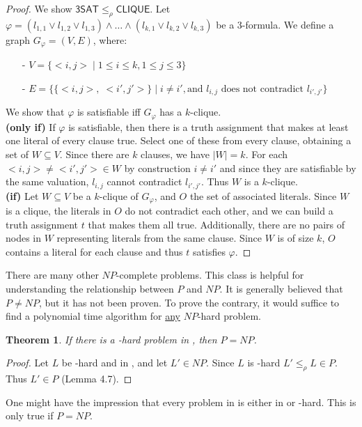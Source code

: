 \documentclass{report}
\newcommand{\NP}{\text{$\mathit{NP}$}\xspace}
\newcommand{\Po}{\text{$\mathit{P}$}\xspace}
\newtheorem{theorem}[definition]{Theorem}
\begin{document}
\begin{proof} We show $\mathsf{3SAT} \leq_\rho \mathsf{CLIQUE}$. Let $\varphi = (l_{1,1} \lor l_{1,2} \lor l_{1,3}) \land \dots \land (l_{k,1} \lor l_{k,2} \lor l_{k,3})$ be a 3-formula. We define a graph $G_\varphi = (V,E)$, where:
\begin{itemize}
\item[-] $V = \{ <i,j>\;|\;1\leq i \leq k, 1\leq j \leq 3\}$
\item[-] $E = \{\{<i,j>,\;<i',j'>\}\;|\;i\neq i', \text{and }l_{i,j} \text{ does not contradict }l_{i',j'}\}$
\end{itemize}
We show that $\varphi$ is satisfiable iff $G_\varphi$ has a $k$-clique.\\
\textbf{(only if)} If $\varphi$ is satisfiable, then there is a truth assignment that makes at least one literal of every clause true. Select one of these from every clause, obtaining a set of $W\subseteq V$. Since there are $k$ clauses, we have $|W| = k$. For each $<i,j>\neq<i',j'> \in W$ by construction $i\neq i'$ and since they are satisfiable by the same valuation, $l_{i,j}$ cannot contradict $l_{i',j'}$. Thus $W$ is a $k$-clique.\\
\textbf{(if)} Let $W \subseteq V$ be a $k$-clique of $G_\varphi$, and $O$ the set of associated literals. Since $W$ is a clique, the literals in $O$ do not contradict each other, and we can build a truth assignment $t$ that makes them all true. Additionally, there are no pairs of nodes in $W$ representing literals from the same clause. Since $W$ is of size $k$, $O$ contains a  literal for each clause and thus $t$ satisfies $\varphi$.
\end{proof}

There are many other $NP$-complete problems. This class is helpful for understanding the relationship between $P$ and $NP$. It is generally believed that $P \neq NP$, but it has not been proven. To prove the contrary, it would suffice to find a polynomial time algorithm for \underline{any} $NP$-hard problem.

\begin{theorem}If there is a \NP-hard problem in \Po, then $\Po=\NP$.
\end{theorem}

\begin{proof} Let $L$ be \NP-hard and in \Po, and let $L' \in \NP$. Since $L$ is \NP-hard $L' \leq_\rho L \in \Po$. Thus $L' \in \Po$ (Lemma 4.7).
\end{proof}

One might have the impression that every problem in \NP is either in \Po or \NP-hard. This is only true if $\Po=\NP$.
\end{document}
